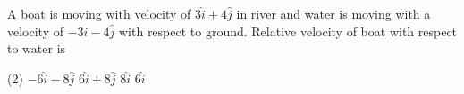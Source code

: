 \item A boat is moving with velocity of $3\hat{i} + 4\hat{j}$ in river and water is moving with a velocity of $-3\hat{i} -4\hat{j}$ with respect to ground. Relative velocity of boat with respect to water is
\begin{tasks}(2)
\task $-6\hat{i} -8\hat{j}$
\task $6\hat{i} +8\hat{j}$\ans
\task $8\hat{i}$
\task $6\hat{i}$
\end{tasks}
